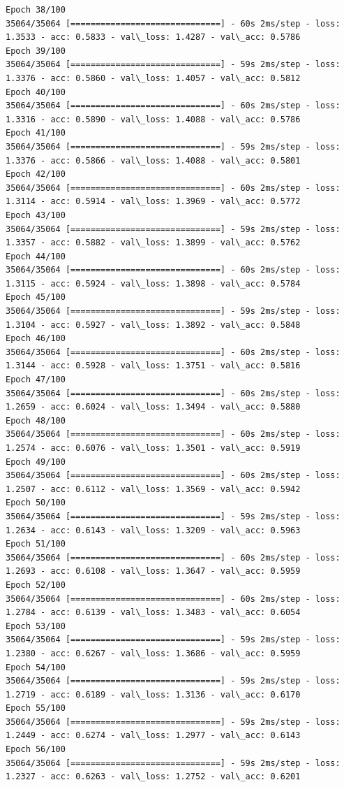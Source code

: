 \documentclass[11pt]{article}
\begin{document}
\begin{Verbatim}[commandchars=\\\{\}]
Epoch 38/100
35064/35064 [==============================] - 60s 2ms/step - loss: 1.3533 - acc: 0.5833 - val\_loss: 1.4287 - val\_acc: 0.5786
Epoch 39/100
35064/35064 [==============================] - 59s 2ms/step - loss: 1.3376 - acc: 0.5860 - val\_loss: 1.4057 - val\_acc: 0.5812
Epoch 40/100
35064/35064 [==============================] - 60s 2ms/step - loss: 1.3316 - acc: 0.5890 - val\_loss: 1.4088 - val\_acc: 0.5786
Epoch 41/100
35064/35064 [==============================] - 59s 2ms/step - loss: 1.3376 - acc: 0.5866 - val\_loss: 1.4088 - val\_acc: 0.5801
Epoch 42/100
35064/35064 [==============================] - 60s 2ms/step - loss: 1.3114 - acc: 0.5914 - val\_loss: 1.3969 - val\_acc: 0.5772
Epoch 43/100
35064/35064 [==============================] - 59s 2ms/step - loss: 1.3357 - acc: 0.5882 - val\_loss: 1.3899 - val\_acc: 0.5762
Epoch 44/100
35064/35064 [==============================] - 60s 2ms/step - loss: 1.3115 - acc: 0.5924 - val\_loss: 1.3898 - val\_acc: 0.5784
Epoch 45/100
35064/35064 [==============================] - 59s 2ms/step - loss: 1.3104 - acc: 0.5927 - val\_loss: 1.3892 - val\_acc: 0.5848
Epoch 46/100
35064/35064 [==============================] - 60s 2ms/step - loss: 1.3144 - acc: 0.5928 - val\_loss: 1.3751 - val\_acc: 0.5816
Epoch 47/100
35064/35064 [==============================] - 60s 2ms/step - loss: 1.2659 - acc: 0.6024 - val\_loss: 1.3494 - val\_acc: 0.5880
Epoch 48/100
35064/35064 [==============================] - 60s 2ms/step - loss: 1.2574 - acc: 0.6076 - val\_loss: 1.3501 - val\_acc: 0.5919
Epoch 49/100
35064/35064 [==============================] - 60s 2ms/step - loss: 1.2507 - acc: 0.6112 - val\_loss: 1.3569 - val\_acc: 0.5942
Epoch 50/100
35064/35064 [==============================] - 59s 2ms/step - loss: 1.2634 - acc: 0.6143 - val\_loss: 1.3209 - val\_acc: 0.5963
Epoch 51/100
35064/35064 [==============================] - 60s 2ms/step - loss: 1.2693 - acc: 0.6108 - val\_loss: 1.3647 - val\_acc: 0.5959
Epoch 52/100
35064/35064 [==============================] - 60s 2ms/step - loss: 1.2784 - acc: 0.6139 - val\_loss: 1.3483 - val\_acc: 0.6054
Epoch 53/100
35064/35064 [==============================] - 59s 2ms/step - loss: 1.2380 - acc: 0.6267 - val\_loss: 1.3686 - val\_acc: 0.5959
Epoch 54/100
35064/35064 [==============================] - 59s 2ms/step - loss: 1.2719 - acc: 0.6189 - val\_loss: 1.3136 - val\_acc: 0.6170
Epoch 55/100
35064/35064 [==============================] - 59s 2ms/step - loss: 1.2449 - acc: 0.6274 - val\_loss: 1.2977 - val\_acc: 0.6143
Epoch 56/100
35064/35064 [==============================] - 59s 2ms/step - loss: 1.2327 - acc: 0.6263 - val\_loss: 1.2752 - val\_acc: 0.6201

\end{Verbatim}
\end{document}
